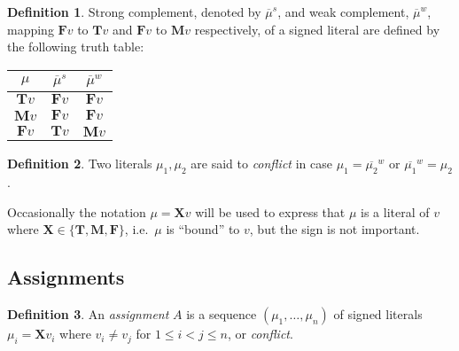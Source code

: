 \documentclass{vutinfth} %
\theoremstyle{example}
\theoremstyle{definition}
\newtheorem{definition}{Definition}[section]
\theoremstyle{theorem}
\theoremstyle{lemma}
\theoremstyle{corollary}
\newcommand{\mbt}{must-be-true}
\newcommand{\negstrong}[1]{\overline{#1}^s}
\newcommand{\negweak}[1]{\overline{#1}^w}
\newcommand{\ass}{A}
\newcommand{\bT}{\mathbf{T}}
\newcommand{\bM}{\mathbf{M}}
\newcommand{\bF}{\mathbf{F}}
\newcommand{\bX}{\mathbf{X}}
\newcommand{\sgl}{\mu}
\newcommand{\bsgl}{\sigma}
\newcommand{\thrice}{{\{\bT, \bM, \bF \}}}
\newcommand{\wkn}{\textit{weaken}}
\begin{document}


\begin{definition}
Strong complement, denoted by $\negstrong{\sgl}$, and weak complement, $\negweak{\sgl}$, mapping $\bF v$ to $\bT v$ and $\bF v$ to $\bM v$ respectively, of a signed literal are defined by the following truth table:%

\begin{center}
\begin{tabular}{|c|cc|}
\hline
$\sgl$&$\negstrong{\sgl}$&$\negweak{\sgl}$\\
\hline
\hline
$\bT v$&$\bF v$&$\bF v$\\
$\bM v$&$\bF v$&$\bF v$\\
$\bF v$&$\bT v$&$\bM v$\\
\hline
\end{tabular}
\end{center}
\end{definition}

\begin{definition}
Two literals $\sgl_1, \sgl_2$ are said to \emph{conflict} in case $\sgl_1 = \negweak{\sgl_2}$ or $\negweak{\sgl_1} = \sgl_2$.
\end{definition}

Occasionally the notation $\sgl = \bX v$ will be used to express that $\sgl$ is a literal of $v$ where $\bX \in \thrice$, i.e.~$\sgl$ is \enquote{bound} to $v$, but the sign is not important.

\subsection{Assignments}

\begin{definition}
An \emph{assignment} $\ass$ is a sequence $(\sgl_1, \ldots, \sgl_n)$ of signed literals $\sgl_i = \bX v_i$ where $v_i \not = v_j$ for $1 \leq i < j \leq n$, or \emph{conflict}.
\end{definition}
\end{document}
